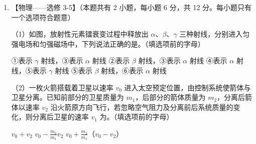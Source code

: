 \documentclass[\gkver]{gaokaozhenti}
\begin{document}
\begin{enumerate}
{（2）一定质量的理想气体，由状态 A 经等容过程到状态 B 有 $\frac{p_{A}}{T_{A}} = \frac{p_{B}}{T_{B}}$，由于 $p_{A} > p_{B}$，所以 $T_{A} > T_{B}$；由状态 B 经等压过程到状态 C 有 $\frac{V_{B}}{T_{B}} = \frac{V_{C}}{T_{C}}$，由于 $V_{B} < V_{C}$，所以 $T_{B} < T_{C}$。故 C 项正确。
}

\item
【物理——选修 3-5】（本题共有 2 小题，每小题 6 分，共 12 分。每小题只有一个选项符合题意）

（1）如图，放射性元素镭衰变过程中释放出 $\alpha$、$\beta$、$\gamma$ 三种射线，分别进入匀强电场和匀强磁场中，下列说法正确的是。（填选项前的字母）


\fourchoices
{①表示 $\gamma$ 射线，③表示 $\alpha$ 射线}
{②表示 $\beta$ 射线，③表示 $\alpha$ 射线}
{④表示 $\alpha$ 射线，⑤表示 $\gamma$ 射线}
{⑤表示 $\beta$ 射线，⑥表示 $\alpha$ 射线}

（2）一枚火箭搭载着卫星以速率 $v_{0}$ 进入太空预定位置，由控制系统使箭体与卫星分离。已知前部分的卫星质量为 $m_{1}$，后部分的箭体质量为 $m_{2}$，分离后箭体以速率 $v_{2}$ 沿火箭原方向飞行，若忽略空气阻力及分离前后系统质量的变化，则分离后卫星的速率 $v_{1}$ 为。（填选项前的字母）


{$v_{0} + v_{2}$}
{$v_{0} - \frac{m_{2}}{m_{1}}v_{2}$}
{$v_{0} + \frac{m_{2}}{m_{1}}$（$v_{0}-v_{2}$）}

\end{enumerate}
\end{document}

